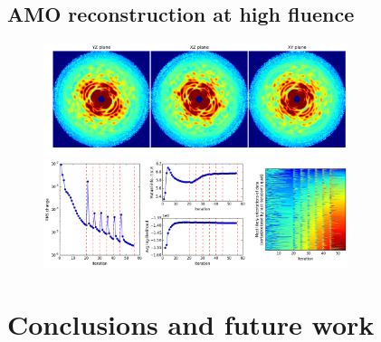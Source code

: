 \documentclass[]{iucr}              %
\begin{document}
\subsection{AMO reconstruction at high fluence} \label{subsec:amohigh}

\begin{figure}
\caption{}
\includegraphics[width=3.5in]{figures/cxi_intens_055.png} \label{fig:cxi_intens}
\includegraphics[width=3.5in]{figures/cxi_log_fig.png} \label{fig:cxi_log_fig}
\end{figure}


\section{Conclusions and future work}


\appendix
\end{document}
